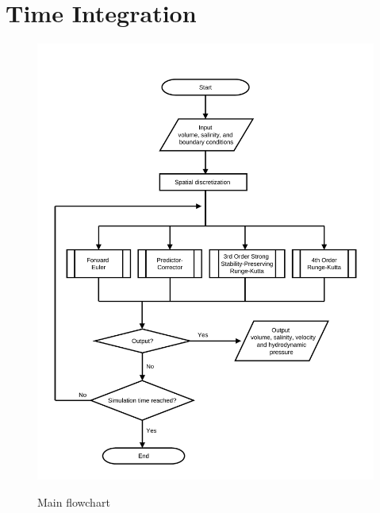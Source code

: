 \normalsize
\section{Time Integration}

\begin{figure}[htbp]
\hspace{0.0in}
\includegraphics[width=5.8in]{../figures/flowcharts/Main.pdf}
\label{fig:flowchart-main}
\caption{Main flowchart}
\end{figure}

